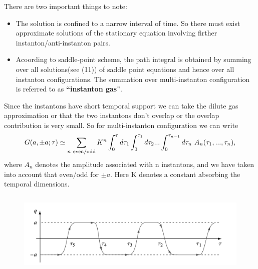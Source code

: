 \documentclass[a4paper, 12pt]{article}
\begin{document}
There are two important things to note:
\begin{itemize}
\item The solution is confined to a narrow interval of time. So there must exist approximate solutions of the stationary equation involving firther instanton/anti-instanton pairs.
\item Acoording to saddle-point scheme, the path integral is obtained by summing over all solutions(see (11)) of saddle point equations and hence over all instanton configurations. The summation over multi-instanton configuration is referred to as \textbf{``instanton gas"}.
\end{itemize}
Since the instantons have short temporal support we can take the dilute gas approximation or that the two instantons don't overlap or the overlap contribution is very small. So for multi-instanton configuration we can write
\begin{equation}
G(a,\pm a; \tau) \simeq \sum_{n\*\ \mathrm{even/odd}}K^n \int_0^{\tau}d\tau_1 \int_0^{\tau_1}d\tau_2 ... \int_0^{\tau_{n-1}}d\tau_n \*\ A_n(\tau_1,...,\tau_n),
\end{equation}
where $A_n$ denotes the amplitude associated with n instantons, and we have taken into account that even/odd for $\pm a$. Here K denotes a constant absorbing the temporal dimensions.
\begin{figure}[ht]
    \centering
    \includegraphics[height=4cm, width=15cm]{fig3}
\end{figure}
\end{document}
